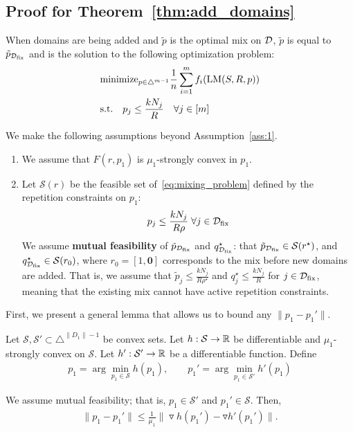 \subsection{Proof for Theorem~\ref{thm:add_domains}}\label{supp:add_domains_proof}

When domains are being added and $\tilde{p}$ is the optimal mix on $\mathcal{D}$, $\tilde{p}$ is equal to $\tilde{p}_{\mathcal{D}_{\text{fix}}}$ and is the solution to the following optimization problem:
\begin{align}
    &\text{minimize}_{p \in \triangle^{m-1}}  \frac{1}{n} \sum_{i = 1}^m f_i(\text{LM}(S, R, p))
    \label{eq:p_mixing_problem} \\
    &\text{s.t.} \quad  p_j \le \frac{k N_j}{R} \quad \forall j \in [m] \nonumber
\end{align}

\begin{assumption}\label{ass:2}
We make the following assumptions beyond Assumption~\ref{ass:1}.
\begin{enumerate}
    \item We assume that $F(r, p_1)$ is $\mu_1$-strongly convex in $p_1$.
    \item Let $\mathcal{S}(r)$ be the feasible set of~\eqref{eq:mixing_problem} defined by the repetition constraints on $p_1$:
    \begin{align*}
        p_j \le \frac{k N_j}{R \rho} \; \forall j \in \mathcal{D}_{\text{fix}}
    \end{align*}
    We assume \textbf{mutual feasibility} of $\tilde{p}_{\mathcal{D}_{\text{fix}}}$ and $q^\star_{\mathcal{D}_{\text{fix}}}$:
    that $\tilde{p}_{\mathcal{D}_{\text{fix}}} \in \mathcal{S}(r^\star)$, and $q^\star_{\mathcal{D}_{\text{fix}}} \in \mathcal{S}(r_0)$, where $r_0 = [1, \mathbf{0}]$ corresponds to the mix before new domains are added. That is, we assume that $\tilde{p}_j \le \frac{k N_j}{R \rho^\star}$ and $q^\star_j \le \frac{k N_j}{R}$ for $j \in \mathcal{D}_{\text{fix}}$, meaning that the existing mix cannot have active repetition constraints.
\end{enumerate}
    
\end{assumption}

First, we present a general lemma that allows us to bound any $\|p_1 - p_1'\|$.

\begin{lemma}\label{lem:argmin_stability_mutual}
Let $\mathcal{S}, \mathcal{S}' \subset \triangle^{\|D_1\| - 1}$ be convex sets. Let $h: \mathcal{S} \rightarrow \mathbb{R}$ be differentiable and $\mu_1$-strongly convex on $\mathcal{S}$. Let $h': \mathcal{S}' \rightarrow \mathbb{R}$ be a differentiable function. Define
\begin{align*}
    p_1 = \arg\min_{p_1 \in \mathcal{S}} h(p_1), \qquad p_1' = \arg\min_{p_1 \in \mathcal{S}'} h'(p_1)
\end{align*}

We assume mutual feasibility; that is, $p_1 \in \mathcal{S}'$ and $p_1' \in \mathcal{S}$. Then,
\begin{align*}
    \|p_1 - p_1'\| \le \frac{1}{\mu_1} \|\triangledown h(p_1') - \triangledown h'(p_1') \|.
\end{align*}
\end{lemma}

